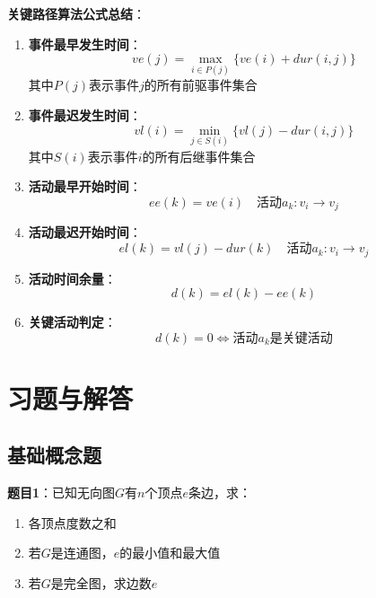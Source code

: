 \documentclass[12pt,a4paper]{amsart}
\begin{document}
\begin{center}
\end{center}

\textbf{关键路径算法公式总结}：

\begin{enumerate}
    \item \textbf{事件最早发生时间}：
    $$ve(j) = \max_{i \in P(j)} \{ve(i) + dur(i,j)\}$$
    其中$P(j)$表示事件$j$的所有前驱事件集合
    
    \item \textbf{事件最迟发生时间}：
    $$vl(i) = \min_{j \in S(i)} \{vl(j) - dur(i,j)\}$$
    其中$S(i)$表示事件$i$的所有后继事件集合
    
    \item \textbf{活动最早开始时间}：
    $$ee(k) = ve(i) \quad \text{活动}a_k: v_i \rightarrow v_j$$
    
    \item \textbf{活动最迟开始时间}：
    $$el(k) = vl(j) - dur(k) \quad \text{活动}a_k: v_i \rightarrow v_j$$
    
    \item \textbf{活动时间余量}：
    $$d(k) = el(k) - ee(k)$$
    
    \item \textbf{关键活动判定}：
    $$d(k) = 0 \Leftrightarrow \text{活动}a_k\text{是关键活动}$$
\end{enumerate}

\section{习题与解答}

\subsection{基础概念题}

\textbf{题目1}：已知无向图$G$有$n$个顶点$e$条边，求：
\begin{enumerate}
    \item 各顶点度数之和
    \item 若$G$是连通图，$e$的最小值和最大值
    \item 若$G$是完全图，求边数$e$
\end{enumerate}
\end{document}
